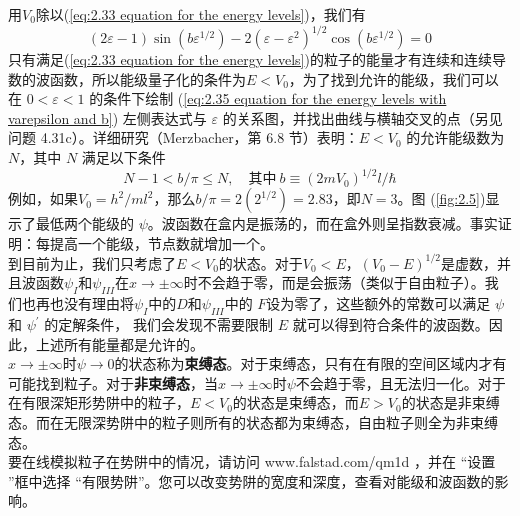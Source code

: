 	用$V_0$除以(\ref{eq:2.33 equation for the energy levels})，我们有
	\begin{equation}
		\left(2\varepsilon-1\right)\sin\left(b\varepsilon^{1/2}\right) - 2\left(\varepsilon - \varepsilon^2 \right)^{1/2}\cos\left(b\varepsilon^{1/2}\right) = 0
		\label{eq:2.35 equation for the energy levels with varepsilon and b}
	\end{equation}
	只有满足(\ref{eq:2.33 equation for the energy levels})的粒子的能量才有连续和连续导数的波函数，所以能级量子化的条件为$E<V_0$，为了找到允许的能级，我们可以在 $0<\varepsilon<1$ 的条件下绘制 (\ref{eq:2.35 equation for the energy levels with varepsilon and b}) 左侧表达式与 $\varepsilon$ 的关系图，并找出曲线与横轴交叉的点（另见问题 4.31c）。详细研究（Merzbacher，第 6.8 节）表明：$E<V_0$ 的允许能级数为 $N$，其中 $N$ 满足以下条件
	\begin{equation}
		N-1 < b/\pi \le N, \quad \text{其中}\: b \equiv \left(2mV_0\right)^{1/2}l /\hbar
		\label{eq:2.36 requirement for allowed energy levels' number N}
	\end{equation}
	例如，如果$V_0 = h^2/ml^2$，那么$b/\pi = 2\left(2^{1/2}\right) = 2.83$，即$N=3$。图 (\ref{fig:2.5})显示了最低两个能级的 $\psi$。波函数在盒内是振荡的，而在盒外则呈指数衰减。事实证明：每提高一个能级，节点数就增加一个。\\
	\indent 到目前为止，我们只考虑了$E<V_0$的状态。对于$V_0<E$，$\left(V_0-E\right)^{1/2}$是虚数，并且波函数$\psi_I$和$\psi_{III}$在$x \to \pm \infty$时不会趋于零，而是会振荡（类似于自由粒子）。我们也再也没有理由将$\psi_I$中的$D$和$\psi_{III}$中的 $F$设为零了，这些额外的常数可以满足 $\psi$ 和 $\psi^{\prime}$ 的定解条件，
	我们会发现不需要限制 $E$ 就可以得到符合条件的波函数。因此，上述所有能量都是允许的。\\
	\indent $x \to \pm \infty$时$\psi \to 0$的状态称为\textbf{束缚态}。对于束缚态，只有在有限的空间区域内才有可能找到粒子。对于\textbf{非束缚态}，当$x \to \pm \infty$时$\psi$不会趋于零，且无法归一化。对于在有限深矩形势阱中的粒子，$E<V_0$的状态是束缚态，而$E>V_0$的状态是非束缚态。而在无限深势阱中的粒子则所有的状态都为束缚态，自由粒子则全为非束缚态。\\
	\indent 要在线模拟粒子在势阱中的情况，请访问 www.falstad.com/qm1d ，并在 “设置 ”框中选择 “有限势阱”。您可以改变势阱的宽度和深度，查看对能级和波函数的影响。
	
